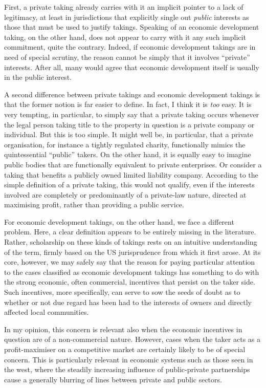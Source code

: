 First, a private taking already carries with it an implicit pointer to a lack of legitimacy, at least in jurisdictions that explicitly single out {\it public} interests as those that must be used to justify takings. Speaking of an economic development taking, on the other hand, does not appear to carry with it any such implicit commitment, quite the contrary. Indeed, if economic development takings are in need of special scrutiny, the reason cannot be simply that it involves ``private'' interests. After all, many would agree that economic development itself is usually in the public interest.

A second difference between private takings and economic development takings is that the former notion is far easier to define. In fact, I think it is {\it too} easy. It is very tempting, in particular, to simply say that a private taking occurs whenever the legal person taking title to the property in question is a private company or individual. But this is too simple. It might well be, in particular, that a private organisation, for instance a tightly regulated charity, functionally mimics the quintessential ``public'' takers. On the other hand, it is equally easy to imagine public bodies that are functionally equivalent to private enterprises. Or consider a taking that benefits a publicly owned limited liability company. According to the simple definition of a private taking, this would not qualify, even if the interests involved are completely or predominantly of a private-law nature, directed at maximising profit, rather than providing a public service.

For economic development takings, on the other hand, we face a different problem. Here, a clear definition appears to be entirely missing in the literature. Rather, scholarship on these kinds of takings rests on an intuitive understanding of the term, firmly based on the US jurisprudence from which it first arose. At its core, however, we may safely say that the reason for paying particular attention to the cases classified as economic development takings has something to do with the strong economic, often commercial, incentives that persist on the taker side. Such incentives, more specifically, can serve to sow the seeds of doubt as to whether or not due regard has been had to the interests of owners and directly affected local communities.

In my opinion, this concern is relevant also when the economic incentives in question are of a non-commercial nature. However, cases when the taker acts as a profit-maximiser on a competitive market are certainly likely to be of special concern. This is particularly relevant in economic systems such as those seen in the west, where the steadily increasing influence of public-private partnerships cause a generally blurring of lines between private and public sectors. 

